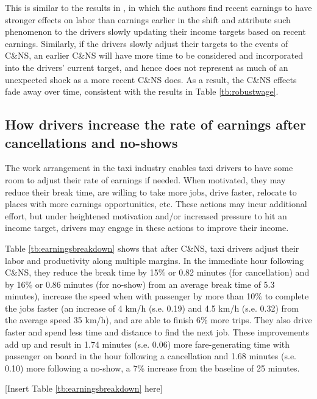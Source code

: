 \documentclass[reviewmode,AEJ]{AEA}
\begin{document}
This is similar to the results in \citet{thakral2018daily}, in which the authors find recent
earnings to have stronger effects on labor than earnings earlier in the shift 
and attribute such phenomenon to the drivers slowly updating their income targets based on recent earnings.
Similarly, if the drivers slowly adjust their targets to the events of C\&NS, an earlier C\&NS will have
more time to be considered and incorporated into the drivers' current target, and hence does not represent
as much of an unexpected shock as a more recent C\&NS does. As a result, the C\&NS effects fade away over
time, consistent with the results in Table \ref{tb:robustwage}.


\subsection{How drivers increase the rate of earnings after cancellations and no-shows}
The work arrangement in the taxi industry enables taxi drivers to have some room to adjust their rate of earnings if needed. When motivated, they may reduce their break time, are willing to take more jobs, drive faster, relocate to places with more earnings opportunities, etc. These actions may incur additional effort, but under heightened motivation and/or increased pressure to hit an income target, drivers may engage 
in these actions to improve their income.

Table \ref{tb:earningsbreakdown} shows that after C\&NS, taxi drivers adjust their labor and productivity along multiple margins. In the immediate hour following C\&NS, they reduce the break time by 15\% or 0.82 minutes (for cancellation) and by 16\% or 0.86 minutes (for no-show) from an average break time of 5.3 minutes), increase the speed when with passenger by more than 10\% to complete the jobs faster (an increase of 4 km/h (s.e. 0.19) and 4.5 km/h (s.e. 0.32) from the average speed 35 km/h), and are able to finish 6\% more trips. They also drive faster and spend less time and distance to find the next job. These improvements add up and result in 1.74 minutes (s.e. 0.06) more fare-generating time with passenger on board in the hour following a cancellation and 1.68 minutes (s.e. 0.10) more following a no-show, a 7\% increase from the baseline of 25 minutes.  

\begin{center}
	[Insert Table \ref{tb:earningsbreakdown} here]
\end{center}
\end{document}
